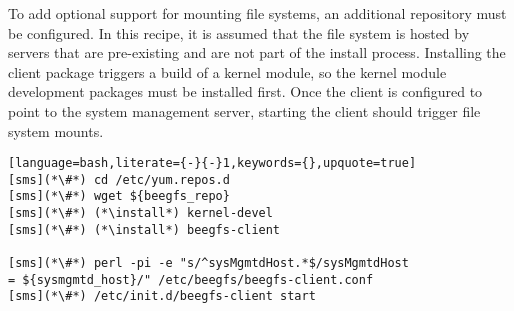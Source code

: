 To add optional support for mounting \beegfs{} file systems, an 
additional \pkgmgr{} repository must be configured. In this recipe, it is
assumed that the \beegfs{} file system is hosted by servers that are pre-existing
and are not part of the install process. Installing the client package triggers
a build of a kernel module, so the kernel module development packages must be
installed first. Once the client is configured to point 
to the \beegfs{} system management server, starting the client should trigger file 
system mounts.

\begin{lstlisting}[language=bash,literate={-}{-}1,keywords={},upquote=true]
[sms](*\#*) cd /etc/yum.repos.d
[sms](*\#*) wget ${beegfs_repo}
[sms](*\#*) (*\install*) kernel-devel
[sms](*\#*) (*\install*) beegfs-client

[sms](*\#*) perl -pi -e "s/^sysMgmtdHost.*$/sysMgmtdHost                  = ${sysmgmtd_host}/" /etc/beegfs/beegfs-client.conf
[sms](*\#*) /etc/init.d/beegfs-client start
\end{lstlisting}
